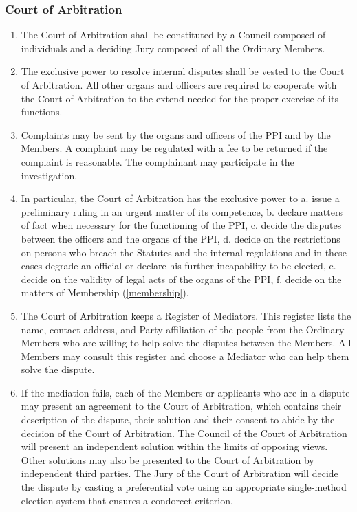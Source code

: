 \begin{frame}

\frametitle{Court of Arbitration}
\label{courtofarbitration}

\begin{enumerate}
\item The Court of Arbitration shall be constituted by a Council composed of individuals and a deciding Jury composed of all the Ordinary Members.

\item The exclusive power to resolve internal disputes shall be vested to the Court of Arbitration. All other organs and officers are required to cooperate with the Court of Arbitration to the extend needed for the proper exercise of its functions.

\item Complaints may be sent by the organs and officers of the PPI and by the Members. A complaint may be regulated with a fee to be returned if the complaint is reasonable. The complainant may participate in the investigation.

\item In particular, the Court of Arbitration has the exclusive power to
 a. issue a preliminary ruling in an urgent matter of its competence,
 b. declare matters of fact when necessary for the functioning of the PPI,
 c. decide the disputes between the officers and the organs of the PPI,
 d. decide on the restrictions on persons who breach the Statutes and the internal regulations and in these cases degrade an official or declare his further incapability to be elected,
 e. decide on the validity of legal acts of the organs of the PPI,
 f. decide on the matters of Membership (\autoref{membership}).

\item The Court of Arbitration keeps a Register of Mediators. This register lists the name, contact address, and Party affiliation of the people from the Ordinary Members who are willing to help solve the disputes between the Members. All Members may consult this register and choose a Mediator who can help them solve the dispute.

\item If the mediation fails, each of the Members or applicants who are in a dispute may present an agreement to the Court of Arbitration, which contains their description of the dispute, their solution and their consent to abide by the decision of the Court of Arbitration. The Council of the Court of Arbitration will present an independent solution within the limits of opposing views. Other solutions may also be presented to the Court of Arbitration by independent third parties. The Jury of the Court of Arbitration will decide the dispute by casting a preferential vote using an appropriate single-{}method election system that ensures a condorcet criterion.


\end{enumerate}
\end{frame}
